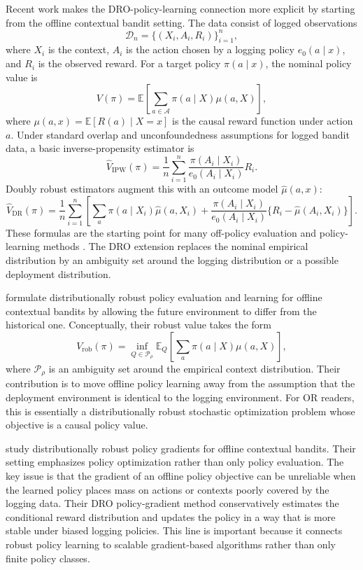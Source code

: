 \documentclass[11pt]{article}
\begin{document}
Recent work makes the DRO-policy-learning connection more explicit by starting from the offline contextual bandit setting. The data consist of logged observations
\[
    \mathcal{D}_n=\{(X_i,A_i,R_i)\}_{i=1}^n,
\]
where $X_i$ is the context, $A_i$ is the action chosen by a logging policy $e_0(a\mid x)$, and $R_i$ is the observed reward. For a target policy $\pi(a\mid x)$, the nominal policy value is
\[
    V(\pi)=\mathbb{E}\left[\sum_{a\in\mathcal{A}}\pi(a\mid X)\mu(a,X)\right],
\]
where $\mu(a,x)=\mathbb{E}[R(a)\mid X=x]$ is the causal reward function under action $a$. Under standard overlap and unconfoundedness assumptions for logged bandit data, a basic inverse-propensity estimator is
\[
    \widehat{V}_{\mathrm{IPW}}(\pi)
    =
    \frac{1}{n}\sum_{i=1}^{n}
    \frac{\pi(A_i\mid X_i)}{e_0(A_i\mid X_i)}R_i.
\]
Doubly robust estimators augment this with an outcome model $\hat{\mu}(a,x)$:
\[
    \widehat{V}_{\mathrm{DR}}(\pi)
    =
    \frac{1}{n}\sum_{i=1}^{n}
    \left[
    \sum_{a}\pi(a\mid X_i)\hat{\mu}(a,X_i)
    +
    \frac{\pi(A_i\mid X_i)}{e_0(A_i\mid X_i)}
    \{R_i-\hat{\mu}(A_i,X_i)\}
    \right].
\]
These formulas are the starting point for many off-policy evaluation and policy-learning methods \citep{dudik2011doubly,swaminathan2015counterfactual,athey2021policy}. The DRO extension replaces the nominal empirical distribution by an ambiguity set around the logging distribution or a possible deployment distribution.

\citet{si2020dro} formulate distributionally robust policy evaluation and learning for offline contextual bandits by allowing the future environment to differ from the historical one. Conceptually, their robust value takes the form
\[
    V_{\mathrm{rob}}(\pi)
    =
    \inf_{Q\in\mathcal{P}_{\rho}}
    \mathbb{E}_{Q}\left[
    \sum_{a}\pi(a\mid X)\mu(a,X)
    \right],
\]
where $\mathcal{P}_{\rho}$ is an ambiguity set around the empirical context distribution. Their contribution is to move offline policy learning away from the assumption that the deployment environment is identical to the logging environment. For OR readers, this is essentially a distributionally robust stochastic optimization problem whose objective is a causal policy value.

\citet{yang2023dropo} study distributionally robust policy gradients for offline contextual bandits. Their setting emphasizes policy optimization rather than only policy evaluation. The key issue is that the gradient of an offline policy objective can be unreliable when the learned policy places mass on actions or contexts poorly covered by the logging data. Their DRO policy-gradient method conservatively estimates the conditional reward distribution and updates the policy in a way that is more stable under biased logging policies. This line is important because it connects robust policy learning to scalable gradient-based algorithms rather than only finite policy classes.
\end{document}

